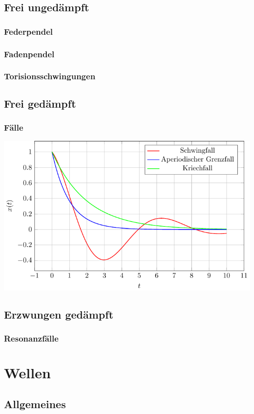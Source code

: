 \documentclass[german]{latex4ei/latex4ei_sheet}
\begin{document}
\subsection{Frei ungedämpft}
\subsubsection{Federpendel}
\subsubsection{Fadenpendel}
\subsubsection{Torisionsschwingungen}
\subsection{Frei gedämpft}
\subsubsection{Fälle}
\includegraphics[width=.9\columnwidth]{img/Schwingungen.pdf}
\subsection{Erzwungen gedämpft}
\subsubsection{Resonanzfälle}

\section{Wellen}
\subsection{Allgemeines}
\end{document}
